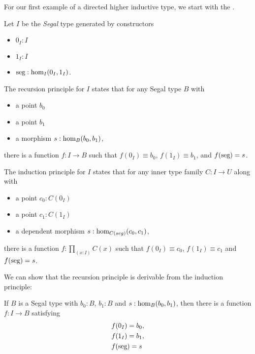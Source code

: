 \documentclass[main.tex]{subfiles}
\begin{document}
\noindent 
For our first example of a directed higher inductive type, we start with the . 

 Let $I$ be the \textit{Segal} type generated by constructors

\begin{itemize}
    \item $0_I : I$
    \item $1_I : I$
    \item $\seg : \ho[I]{0_I}{1_I}$.
\end{itemize}


\noindent The recursion principle for $I$ states that for any Segal type $B$ with

\begin{itemize}
    \item a point $b_0$
    \item a point $b_1$
    \item a morphism $s : \ho[B]{b_0}{b_1}$,
\end{itemize}
there is a function $f : I \to B$ such that $f(0_I)\equiv b_0$, $f(1_I) \equiv b_1$, and $f(\seg) = s$. 

The induction principle for $I$ states that for any inner type family $C : I \to U$ along with 
\begin{itemize}
    \item a point $c_0 : C(0_I)$
    \item a point $c_1 : C(1_I)$
    \item a dependent morphism $s : \ho[C(seg)]{c_0}{c_1}$,
\end{itemize} 
there is a function $ f : \prod_{(x : I)} C(x)$ such that $f(0_I) \equiv c_0$, $f(1_I) \equiv c_1$ and $f(\seg) = s$. %


We can show that the recursion principle is derivable from the induction principle:
\begin{lemma}
 If $B$ is a Segal type with $b_0 : B$, $b_1 : B$ and $s : \ho[B]{b_0}{b_1}$, then there is a function $f : I \to B$ satisfying \begin{align*}
    &f(0_I) = b_0,\\ 
    &f(1_I) = b_1, \\  
    &f(\seg)=s
 \end{align*}
\end{lemma}
\end{document}
